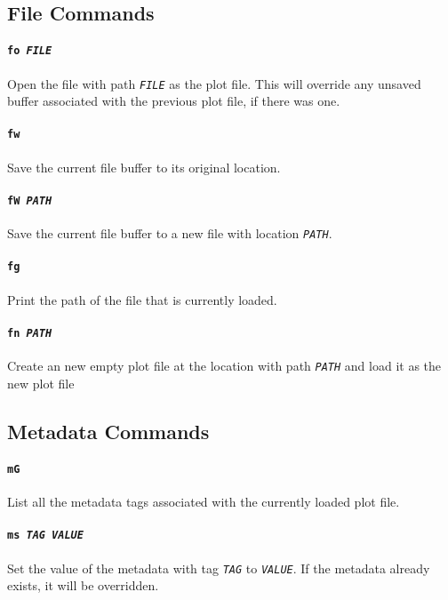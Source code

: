 \documentclass[a4paper]{article}
\begin{document}
\subsection{File Commands}

\paragraph{\texttt{fo \textit{FILE}}}
Open the file with path \texttt{\textit{FILE}} as the plot file. This will 
override any unsaved buffer associated with the previous plot file, if 
there was one.

\paragraph{\texttt{fw}}
Save the current file buffer to its original location.

\paragraph{\texttt{fW \textit{PATH}}}
Save the current file buffer to a new file with location 
\texttt{\textit{PATH}}.

\paragraph{\texttt{fg}}
Print the path of the file that is currently loaded.

\paragraph{\texttt{fn \textit{PATH}}}
Create an new empty plot file at the location with path \texttt{\textit{PATH}} 
and load it as the new plot file

\subsection{Metadata Commands}

\paragraph{\texttt{mG}}
List all the metadata tags associated with the currently loaded plot file.

\paragraph{\texttt{ms \textit{TAG VALUE}}}
Set the value of the metadata with tag \texttt{\textit{TAG}} to 
\texttt{\textit{VALUE}}. If the metadata already exists, it will be 
overridden.
\end{document}
